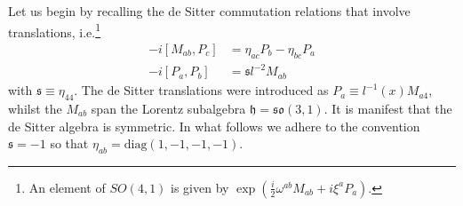 \documentclass[11pt]{article}
\begin{document}
Let us begin by recalling the de Sitter commutation relations 
that involve translations, i.e.\footnote{An element of $SO(4,1)$ 
	is given by $\exp(\tfrac{i}{2}\omega^{ab}M_{ab} + i\xi^a 
	P_a)$.}
%
\begin{equation}\label{eq:comm_rels_dS}
	\begin{split}
		-i[M_{ab},P_c] &= \eta_{ac}P_b - \eta_{bc}P_a \\
		-i[P_a,P_b] &= \mathfrak{s}l^{-2} M_{ab}
	\end{split}
\end{equation}
with $\mathfrak{s} \equiv \eta_{44}$. The de Sitter translations 
were introduced as $P_a \equiv l^{-1}(x)M_{a4}$, whilst the 
$M_{ab}$ span the Lorentz subalgebra $\mathfrak{h} = 
\mathfrak{so}(3,1)$.  It is manifest that the de Sitter algebra 
is symmetric.  In what follows we adhere to the convention 
$\mathfrak{s} = -1$ so that $\eta_{ab} = 
\mathrm{diag}(1,-1,-1,-1)$.
\end{document}
